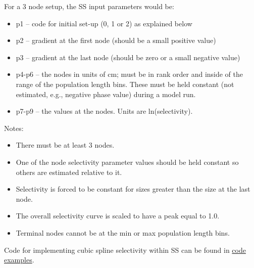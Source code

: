For a 3 node setup, the SS input parameters would be:
	\begin{itemize}
		\item p1 – 	code for initial set-up (0, 1 or 2) as explained below
		\item p2 – 	gradient at the first node (should be a small positive value)
		\item p3 – 	gradient at the last node (should be zero or a small negative value)
		\item p4-p6 – the nodes in units of cm; must be in rank order and inside of the range of the population length bins.  These must be held constant (not estimated, e.g., negative phase value) during a model run.
		\item  p7-p9 – the values at the nodes. Units are ln(selectivity).
	\end{itemize}

Notes:
	\begin{itemize}
		\item There must be at least 3 nodes.
		\item One of the node selectivity parameter values should be held constant so others are estimated relative to it.
		\item Selectivity is forced to be constant for sizes greater than the size at the last node.
		\item The overall selectivity curve is scaled to have a peak equal to 1.0.
		\item Terminal nodes cannot be at the min or max population length bins.
	\end{itemize}
	
Code for implementing cubic spline selectivity within SS can be found in \hyperlink{CubicSpline}{code examples}.


